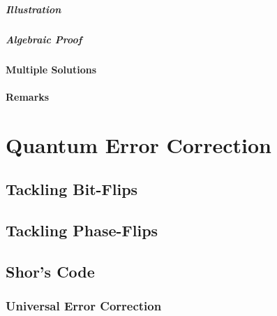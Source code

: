                \paragraph{Illustration} %

                \paragraph{Algebraic Proof} %

            \subsubsection{Multiple Solutions} %

            \subsubsection{Remarks} %

\chapter{Quantum Error Correction} %

    \section{Tackling Bit-Flips} %

    \section{Tackling Phase-Flips} %

    \section{Shor's Code} %

        \subsection{Universal Error Correction} %

